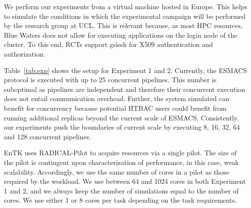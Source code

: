 We perform our experiments from a virtual machine hosted in Europe. This
helps to simulate the conditions in which the experimental campaign will be
performed by the research group at UCL\@. This is relevant because, as most
HPC resources, Blue Waters does not allow for executing applications on the
login node of the cluster. To this end, RCTs support \textmd{gsissh} for X509
authentication and authorization.

Table~\ref{tab:exp} shows
the setup for Experiment 1 and 2. Currently, the ESMACS protocol is executed
with up to 25 concurrent pipelines. This number is suboptimal as pipelines
are independent and therefore their concurrent execution does not entail
communication overhead. Further, the system simulated can benefit for
concurrency because potential HTBAC users could benefit from running additional replicas beyond the current scale of ESMACS. Consistently, our experiments push the boundaries of current scale by executing 8, 16, 32, 64 and 128 concurrent pipelines.


EnTK uses RADICAL-Pilot to acquire resources via a single pilot. 
The size of the pilot is contingent upon characterization of performance, in
this case, weak %
scalability. %
Accordingly, we %
use the same number of cores in a pilot %
as %
those required by the workload. 
We use between 64 and 1024 cores in both Experiment 1 and 2, and we always
keep the number of simulations %
equal to the number of cores. %
We 
use either 1 or 8 cores per task %
depending on the task requirements.


